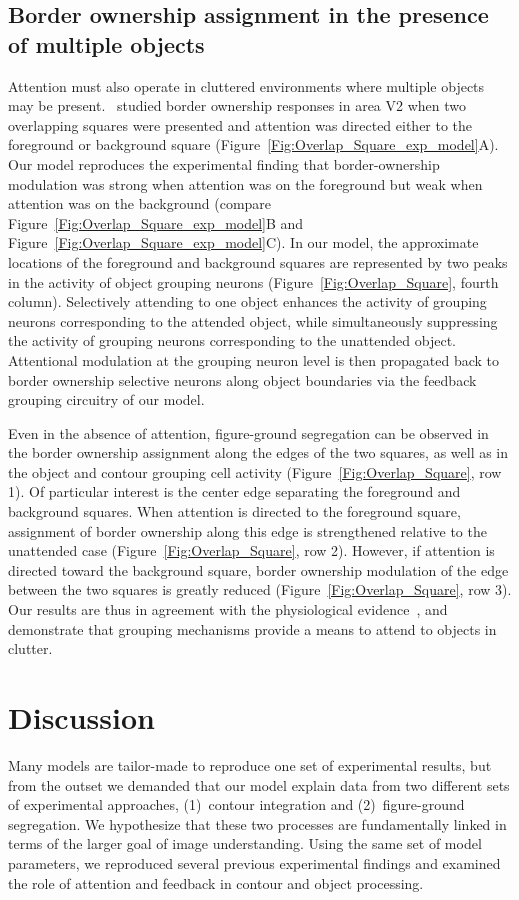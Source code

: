 \subsection{Border ownership assignment in the presence of multiple objects}
\label{sec:BOS_overlap}
Attention must also operate in cluttered environments where multiple objects may be present.~\cite{Qiu_etal07} studied border ownership
responses in area V2 when two overlapping squares were presented and
attention was directed either to the foreground or background square
(Figure~\ref{Fig:Overlap_Square_exp_model}A). Our model reproduces the experimental finding that  border-ownership modulation was strong when attention was on the foreground but weak when attention was on the background (compare Figure~\ref{Fig:Overlap_Square_exp_model}B and Figure~\ref{Fig:Overlap_Square_exp_model}C). In our model, the approximate locations of the foreground and background squares are represented by two peaks in the activity of object grouping neurons (Figure~\ref{Fig:Overlap_Square}, fourth column). Selectively attending to one object enhances the activity of grouping neurons corresponding to the attended object, while simultaneously suppressing the activity of grouping neurons corresponding to the unattended object. Attentional modulation at the grouping neuron level is then propagated back to border ownership selective neurons along object boundaries via the feedback grouping circuitry of our model.

Even in the absence of attention, figure-ground segregation can be observed in the border ownership assignment along the edges of the two squares, as well as in the object and contour grouping cell activity
(Figure~\ref{Fig:Overlap_Square}, row 1). Of particular interest is
the center edge separating the foreground and background squares. When
attention is directed to the foreground square, assignment of border
ownership along this edge is strengthened relative to the unattended case (Figure~\ref{Fig:Overlap_Square}, row 2). However, if attention is
directed toward the background square, border ownership modulation of
the edge between the two squares is greatly reduced (Figure~\ref{Fig:Overlap_Square}, row 3). Our results are thus in agreement with the physiological evidence~\citep{Qiu_etal07}, and demonstrate that grouping mechanisms provide a means to attend to objects in clutter. 

\section{Discussion}
\label{sec:discussion}
Many models are tailor-made to reproduce one set of experimental results, but from the outset we demanded that our model explain data from two different sets of experimental approaches, (1)~contour integration and (2)~figure-ground segregation. We hypothesize that these two processes are fundamentally linked in terms of the larger goal of image understanding. Using the same set of model parameters, we reproduced several previous experimental findings and examined the role of attention and feedback in contour and object processing. 

